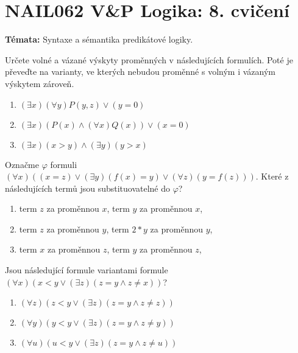 \documentclass[a4paper,12pt]{article}
\begin{document}
\section*{NAIL062 V\&P Logika: 8. cvičení}


\textbf{Témata:}
Syntaxe a sémantika predikátové logiky.


\medskip\begin{problem}
    Určete volné a vázané výskyty proměnných v následujících formulích. Poté je převeďte na varianty, ve kterých nebudou proměnné s volným i vázaným výskytem zároveň.
    \begin{enumerate}
       \item $(\exists x)(\forall y)P(y,z) \vee (y=0)$
       \item $(\exists x)(P(x) \wedge (\forall x)Q(x)) \vee (x=0)$
       \item $(\exists x)(x>y) \wedge (\exists y)(y>x)$
    \end{enumerate}
    \end{problem}
    
    \medskip\begin{problem}
    Označme $\varphi$ formuli $(\forall x)((x=z) \vee (\exists y)(f(x)=y) \vee (\forall z)(y=f(z)))$. Které z následujících termů jsou substituovatelné do $\varphi$?
    \begin{enumerate}
       \item term $z$ za proměnnou $x$, term $y$ za proměnnou $x$,
       \item term $z$ za proměnnou $y$, term $2*y$ za proměnnou $y$,
       \item term $x$ za proměnnou $z$, term $y$ za proměnnou $z$,
    \end{enumerate}
\end{problem}
    
\medskip\begin{problem}
    Jsou následující formule variantami formule $(\forall x)(x<y \vee (\exists z)(z=y \wedge z\ne x))$?
    \begin{enumerate}
    \item $(\forall z)(z<y \vee (\exists z)(z=y \wedge z\ne z))$
    \item $(\forall y)(y<y \vee (\exists z)(z=y \wedge z\ne y))$
    \item $(\forall u)(u<y \vee (\exists z)(z=y \wedge z\ne u))$
    \end{enumerate}
\end{problem}
    
\end{document}
